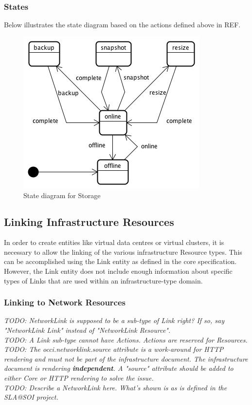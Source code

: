 \documentclass[10pt,a4paper]{article}
\begin{document}
\subsubsection{States}
Below illustrates the state diagram based on the actions defined above in REF.

\begin{figure}[!h]
	\centering
	\includegraphics[scale=0.4]{figs/storage-state.png}
	\caption{State diagram for Storage}
	\label{fig:storage_state}
\end{figure}

\subsection{Linking Infrastructure Resources}
In order to create entities like virtual data centres or virtual clusters, it is necessary to allow the linking of the various infrastructure Resource types. This can be accomplished using the Link entity as defined in the core specification. However, the Link entity does not include enough information about specific types of Links that are used within an infrastructure-type domain.
\subsubsection{Linking to Network Resources}
\textit{TODO: NetworkLink is supposed to be a sub-type of Link right? If so, say "NetworkLink Link" instead of "NetworkLink Resource".} \\
\textit{TODO: A Link sub-type cannot have Actions. Actions are reserved for Resources.} \\
\textit{TODO: The occi.networklink.source attribute is a work-around for HTTP rendering and must not be part of the infrastructure document. The infrastructure document is rendering {\bf independent}. A "source" attribute should be added to either Core or HTTP rendering to solve the issue.} \\
\textit{TODO: Describe a NetworkLink here. What's shown is as is defined in the SLA@SOI project.}
\end{document}
